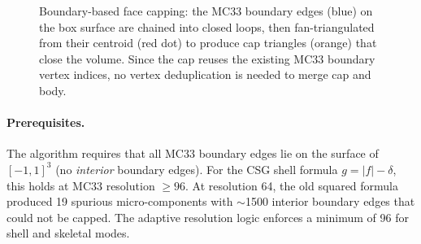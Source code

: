 \documentclass[11pt]{article}
\begin{document}
\begin{figure}[h]
\centering
{}
\caption{Boundary-based face capping: the MC33 boundary edges
(blue) on the box surface are chained into closed loops, then
fan-triangulated from their centroid (red dot) to produce cap
triangles (orange) that close the volume.  Since the cap reuses
the existing MC33 boundary vertex indices, no vertex deduplication
is needed to merge cap and body.}
\label{fig:capping}
\end{figure}

\paragraph{Prerequisites.}
The algorithm requires that all MC33 boundary edges lie on the
surface of $[-1,1]^3$ (no \emph{interior} boundary edges).  For the
CSG shell formula $g = |f| - \delta$, this holds at MC33 resolution
$\ge 96$.  At resolution 64, the old squared formula produced 19
spurious micro-components with $\sim$1500 interior boundary edges
that could not be capped.  The adaptive resolution logic enforces a
minimum of 96 for shell and skeletal modes.
\end{document}
